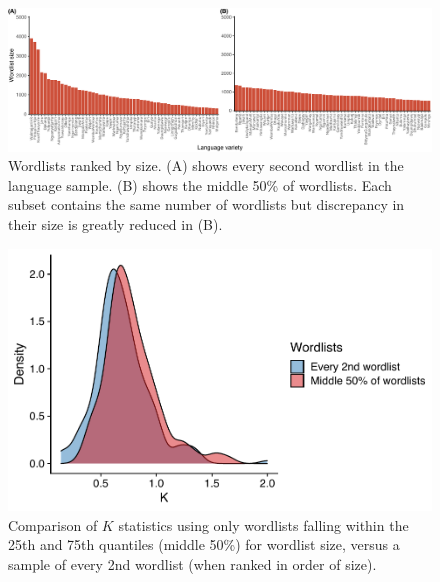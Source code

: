 \begin{figure}[tbp]

{\centering \includegraphics[width=1\linewidth]{05-phylo-signal/fig/wordlist_subset_sizes} 

}

\caption[Wordlists ranked by size]{Wordlists ranked by size. (A) shows every second wordlist in the language sample. (B) shows the middle 50\% of wordlists. Each subset contains the same number of wordlists but discrepancy in their size is greatly reduced in (B).}\label{fig:wordlist-subset-sizes}
\end{figure}

\begin{figure}[tbp]

{\centering \includegraphics[width=0.66\linewidth]{05-phylo-signal/fig/k-IQR-vs-Every2nd} 

}

\caption[Comparison of $K$ statistics using middle quantile wordlists versus every second wordlist]{Comparison of $K$ statistics using only wordlists falling within the 25th and 75th quantiles (middle 50\%) for wordlist size, versus a sample of every 2nd wordlist (when ranked in order of size).}\label{fig:wordlist-uncertainty}
\end{figure}

